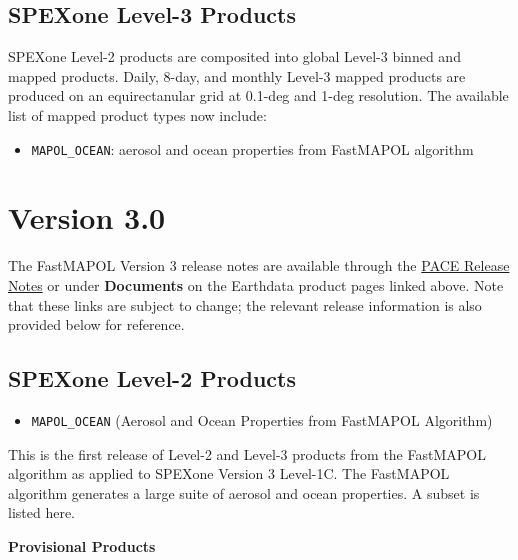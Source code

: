 \documentclass[
  11pt,
  letterpaper,
]{scrreprt}
\providecommand{\tightlist}{%
  \setlength{\itemsep}{0pt}\setlength{\parskip}{0pt}}
\begin{document}
\subsection*{SPEXone Level-3 Products}\label{spexone-level-3-products}

SPEXone Level-2 products are composited into global Level-3 binned and
mapped products. Daily, 8-day, and monthly Level-3 mapped products are
produced on an equirectanular grid at 0.1-deg and 1-deg resolution. The
available list of mapped product types now include:

\begin{itemize}
\tightlist
\item
  \texttt{MAPOL\_OCEAN}: aerosol and ocean properties from FastMAPOL
  algorithm
\end{itemize}

\section*{Version 3.0}\label{version-3.0-1}


The FastMAPOL Version 3 release notes are available through the
\href{https://pace.oceansciences.org/access_pace_data.htm}{PACE Release
Notes} or under \textbf{Documents} on the Earthdata product pages linked
above. Note that these links are subject to change; the relevant release
information is also provided below for reference.

\subsection*{SPEXone Level-2 Products}\label{spexone-level-2-products-1}

\begin{itemize}
\tightlist
\item
  \texttt{MAPOL\_OCEAN} (Aerosol and Ocean Properties from FastMAPOL
  Algorithm)
\end{itemize}

This is the first release of Level-2 and Level-3 products from the
FastMAPOL algorithm as applied to SPEXone Version 3 Level-1C. The
FastMAPOL algorithm generates a large suite of aerosol and ocean
properties. A subset is listed here.

\textbf{Provisional Products}
\end{document}
